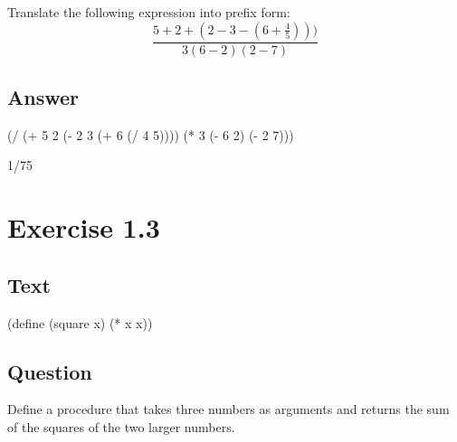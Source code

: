 \documentclass[
]{article}
\newenvironment{Shaded}{}{}
\newcommand{\DecValTok}[1]{\textcolor[rgb]{0.25,0.63,0.44}{#1}}
\newcommand{\ExtensionTok}[1]{#1}
\newcommand{\FunctionTok}[1]{\textcolor[rgb]{0.02,0.16,0.49}{#1}}
\newcommand{\NormalTok}[1]{#1}
\newcommand{\OperatorTok}[1]{\textcolor[rgb]{0.40,0.40,0.40}{#1}}
\begin{document}
Translate the following expression into prefix form: \[
  \frac{5 + 2 + (2 - 3 - (6 + \frac{4}{5})))}
            {3(6 - 2)(2 - 7)}
\]

\hypertarget{answer-1}{%
\subsection{Answer}\label{answer-1}}

\hypertarget{EX1-2}{%
\label{EX1-2}}%
\begin{Shaded}
\begin{Highlighting}[numbers=left,,]
\NormalTok{(}\OperatorTok{/}\NormalTok{ (}\OperatorTok{+} \DecValTok{5} \DecValTok{2}\NormalTok{ (}\OperatorTok{{-}} \DecValTok{2} \DecValTok{3}\NormalTok{ (}\OperatorTok{+} \DecValTok{6}\NormalTok{ (}\OperatorTok{/} \DecValTok{4} \DecValTok{5}\NormalTok{))))}
\NormalTok{   (}\OperatorTok{*} \DecValTok{3}\NormalTok{ (}\OperatorTok{{-}} \DecValTok{6} \DecValTok{2}\NormalTok{) (}\OperatorTok{{-}} \DecValTok{2} \DecValTok{7}\NormalTok{)))}
\end{Highlighting}
\end{Shaded}

1/75

\hypertarget{exercise-1.3}{%
\section{Exercise 1.3}\label{exercise-1.3}}

\hypertarget{text}{%
\subsection{Text}\label{text}}

\hypertarget{square}{%
\label{square}}%
\begin{Shaded}
\begin{Highlighting}[numbers=left,,]
\NormalTok{(}\ExtensionTok{define}\FunctionTok{ }\NormalTok{(square x)}
\NormalTok{  (}\OperatorTok{*}\NormalTok{ x x))}
\end{Highlighting}
\end{Shaded}

\hypertarget{question-2}{%
\subsection{Question}\label{question-2}}

Define a procedure that takes three numbers as arguments and returns the
sum of the squares of the two larger numbers.
\end{document}
